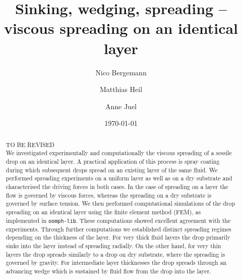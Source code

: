 \documentclass[aip,graphicx]{revtex4-1}
\begin{document}

\title{Sinking, wedging, spreading -- viscous spreading on an
  identical layer}



\author{Nico Bergemann} \author{Matthias Heil} \author{Anne Juel}


\date{\today}

\begin{abstract}
TO BE REVISED\\ We investigated experimentally and computationally the
viscous spreading of a sessile drop on an identical layer.  A
practical application of this process is spray coating during which
subsequent drops spread on an existing layer of the same fluid.  We
performed spreading experiments on a uniform layer as well as on a dry
substrate and characterised the driving forces in both cases.  In the
case of spreading on a layer the flow is governed by viscous forces,
whereas the spreading on a dry substrate is governed by surface
tension.  We then performed computational simulations of the drop
spreading on an identical layer using the finite element method (FEM),
as implemented in \texttt{oomph-lib}.  These computations showed
excellent agreement with the experiments.  Through further
computations we established distinct spreading regimes depending on
the thickness of the layer.  For very thick fluid layers the drop
primarily sinks into the layer instead of spreading radially.  On the
other hand, for very thin layers the drop spreads similarly to a drop
on dry substrate, where the spreading is governed by gravity.  For
intermediate layer thicknesses the drop spreads through an advancing
wedge which is sustained by fluid flow from the drop into the layer.
\end{abstract}
\end{document}
